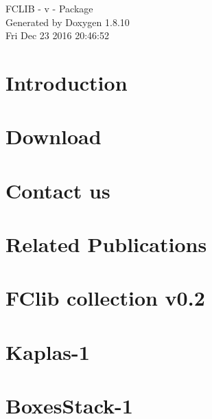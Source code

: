 \documentclass[twoside]{article}
\newcommand{\+}{\discretionary{\mbox{\scriptsize$\hookleftarrow$}}{}{}}
\begin{document}
\hypersetup{pageanchor=false,
             bookmarks=true,
             bookmarksnumbered=true,
             pdfencoding=unicode
            }
\begin{titlepage}
\vspace*{7cm}
\begin{center}%
{\Large F\+C\+L\+I\+B -\/ v -\/ Package }\\
\vspace*{1cm}
{\large Generated by Doxygen 1.8.10}\\
\vspace*{0.5cm}
{\small Fri Dec 23 2016 20:46:52}\\
\end{center}
\end{titlepage}
\tableofcontents
{}
\hypersetup{pageanchor=true}

\section{Introduction}
\label{index}\hypertarget{index}{}
\section{Download}
\label{download}
\hypertarget{download}{}

\section{Contact us}
\label{contact}
\hypertarget{contact}{}

\section{Related Publications}
\label{publications}
\hypertarget{publications}{}

\section{F\+Clib collection v0.2}
\label{problems_0_2}
\hypertarget{problems_0_2}{}

\section{Kaplas-\/1}
\label{kaplas1}
\hypertarget{kaplas1}{}

\section{Boxes\+Stack-\/1}
\label{boxesstack1}
\hypertarget{boxesstack1}{}

\end{document}
